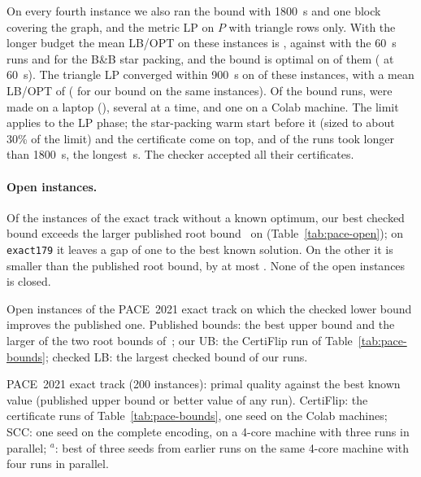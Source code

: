 On every fourth instance we also ran the bound with \SI{1800}{s} and one
block covering the graph, and the metric LP on $P$ with triangle rows only.
With the longer budget the mean LB/OPT on these \numPaceWarmN{} instances is
\numPaceWarmMean{}, against \numPaceWarmOursMean{} with the \SI{60}{s} runs
and \numPaceWarmStarMean{} for the B\&B star packing, and the bound is
optimal on \numPaceWarmOpt{} of them (\numPaceWarmOursOpt{} at \SI{60}{s}).
The triangle LP converged within \SI{900}{s} on \numPaceTriN{} of these
instances, with a mean LB/OPT of \numPaceTriMean{} (\numPaceTriOursMean{}
for our bound on the same instances).  Of the \numWarmRuns{} bound runs,
\numWarmLocal{} were made on a laptop (\numCpuLocal), several at a time, and one
on a Colab machine.  The limit applies to the LP phase; the star-packing warm
start before it (sized to about 30\% of the limit) and the certificate come
on top, and \numWarmOver{} of the \numWarmRuns{} runs took longer than
\SI{1800}{s}, the longest \numWarmMax{}\,s.  The checker accepted all their
certificates.

\paragraph{Open instances.}  Of the \numPaceOpen{} instances of the exact
track without a known optimum, our best checked bound exceeds the larger
published root bound~\cite{BlasiusEtAl22sea} on \numPaceOpenImproved{}
(Table~\ref{tab:pace-open}); on \texttt{exact179} it leaves a gap of one to
the best known solution.  On the other \numPaceOpenBelow{} it is smaller than
the published root bound, by at most \numPaceOpenMaxBelow{}.  None of the
open instances is closed.

\begin{table}[!tbp]
\centering
\caption{Open instances of the PACE~2021 exact track on which the checked
lower bound improves the published one.  Published bounds: the best upper
bound and the larger of the two root bounds of~\cite{BlasiusEtAl22sea}; our
UB: the CertiFlip run of Table~\ref{tab:pace-bounds}; checked LB: the largest
checked bound of our runs.}
\label{tab:pace-open}
\footnotesize
\begin{adjustbox}{max width=\textwidth}\end{adjustbox}
\end{table}

\begin{table}[!tbp]
\centering
\caption{PACE~2021 exact track (200 instances): primal quality against the
best known value (published upper bound or better value of any run).
CertiFlip: the certificate runs of Table~\ref{tab:pace-bounds}, one seed on
the Colab machines; SCC: one seed on the complete encoding, on a 4-core
machine with three runs in parallel; $^a$: best of three seeds from earlier
runs on the same 4-core machine with four runs in parallel.}
\label{tab:pace-primal}
\footnotesize
\begin{adjustbox}{max width=\textwidth}\end{adjustbox}
\end{table}

